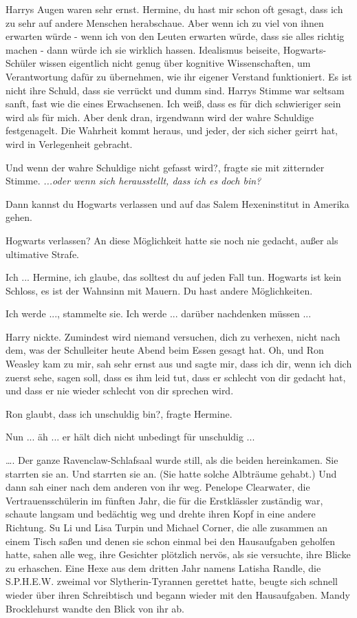 Harrys Augen waren sehr ernst. \glqq{}Hermine, du hast mir schon oft gesagt, dass
ich zu sehr auf andere Menschen herabschaue. Aber wenn ich zu viel von ihnen
erwarten würde - wenn ich von den Leuten erwarten würde, dass sie alles richtig
machen - dann würde ich sie wirklich hassen. Idealismus beiseite,
Hogwarts-Schüler wissen eigentlich nicht genug über kognitive Wissenschaften, um
Verantwortung dafür zu übernehmen, wie ihr eigener Verstand funktioniert. Es ist
nicht ihre Schuld, dass sie verrückt und dumm sind.\grqq{} Harrys Stimme war
seltsam sanft, fast wie die eines Erwachsenen. \glqq{}Ich weiß, dass es für dich
schwieriger sein wird als für mich. Aber denk dran, irgendwann wird der wahre
Schuldige festgenagelt. Die Wahrheit kommt heraus, und jeder, der sich sicher
geirrt hat, wird in Verlegenheit gebracht.\grqq{}

\glqq{}Und wenn der wahre Schuldige nicht gefasst wird?\grqq{}, fragte sie mit
zitternder Stimme. \emph{...oder wenn sich herausstellt, dass ich es doch bin?}

\glqq{}Dann kannst du Hogwarts verlassen und auf das Salem Hexeninstitut in
Amerika gehen.\grqq{}

\glqq{}Hogwarts verlassen?\grqq{} An diese Möglichkeit hatte sie noch nie
gedacht, außer als ultimative Strafe.

\glqq{}Ich ... Hermine, ich glaube, das solltest du auf jeden Fall tun. Hogwarts
ist kein Schloss, es ist der Wahnsinn mit Mauern. Du hast andere
Möglichkeiten.\grqq{}

\glqq{}Ich werde ...\grqq{}, stammelte sie. \glqq{}Ich werde ... darüber nachdenken
müssen ...\grqq{}

Harry nickte. \glqq{}Zumindest wird niemand versuchen, dich zu verhexen, nicht
nach dem, was der Schulleiter heute Abend beim Essen gesagt hat. Oh, und Ron
Weasley kam zu mir, sah sehr ernst aus und sagte mir, dass ich dir, wenn ich
dich zuerst sehe, sagen soll, dass es ihm leid tut, dass er schlecht von dir
gedacht hat, und dass er nie wieder schlecht von dir sprechen wird.\grqq{}

\glqq{}Ron glaubt, dass ich unschuldig bin?\grqq{}, fragte Hermine.

\glqq{}Nun ... äh ... er hält dich nicht unbedingt für unschuldig ...\grqq{}

…. Der ganze Ravenclaw-Schlafsaal wurde still, als die beiden hereinkamen. Sie
starrten sie an. Und starrten sie an. (Sie hatte solche Albträume gehabt.) Und
dann sah einer nach dem anderen von ihr weg. Penelope Clearwater, die
Vertrauensschülerin im fünften Jahr, die für die Erstklässler zuständig war,
schaute langsam und bedächtig weg und drehte ihren Kopf in eine andere Richtung.
Su Li und Lisa Turpin und Michael Corner, die alle zusammen an einem Tisch saßen
und denen sie schon einmal bei den Hausaufgaben geholfen hatte, sahen alle weg,
ihre Gesichter plötzlich nervös, als sie versuchte, ihre Blicke zu erhaschen.
Eine Hexe aus dem dritten Jahr namens Latisha Randle, die S.P.H.E.W. zweimal vor
Slytherin-Tyrannen gerettet hatte, beugte sich schnell wieder über ihren
Schreibtisch und begann wieder mit den Hausaufgaben. Mandy Brocklehurst wandte
den Blick von ihr ab.

